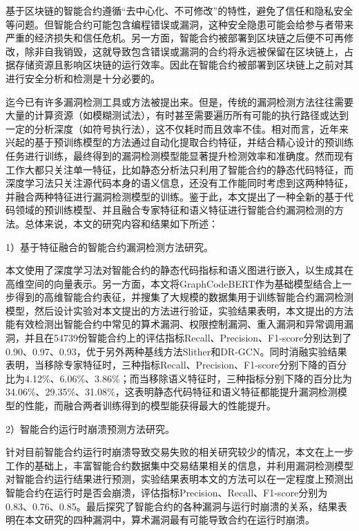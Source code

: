 \cleardoublepage
{}
基于区块链的智能合约遵循“去中心化、不可修改”的特性，避免了信任和隐私安全等问题。但智能合约可能包含编程错误或漏洞，这种安全隐患可能会给参与者带来严重的经济损失和信任危机。另一方面，智能合约被部署到区块链之后便不可再修改，除非自我销毁，这就导致包含错误或漏洞的合约将永远被保留在区块链上，占据存储资源且影响区块链的运行效率。因此在智能合约被部署到区块链上之前对其进行安全分析和检测是十分必要的。

迄今已有许多漏洞检测工具或方法被提出来。但是，传统的漏洞检测方法往往需要大量的计算资源（如模糊测试法），有时甚至需要遍历所有可能的执行路径或达到一定的分析深度（如符号执行法），这不仅耗时而且效率不佳。相对而言，近年来兴起的基于预训练模型的方法通过自动化提取合约特征，并结合精心设计的预训练任务进行训练，最终得到的漏洞检测模型能显著提升检测效率和准确度。然而现有工作大都只关注单一特征，比如静态分析法只利用了智能合约的静态代码特征，而深度学习法只关注源代码本身的语义信息，还没有工作能同时考虑到这两种特征，并融合两种特征进行漏洞检测模型的训练。鉴于此，本文提出了一种全新的基于代码领域的预训练模型、并且融合专家特征和语义特征进行智能合约漏洞检测的方法。总体来说，本文的研究内容和结果如下所述：

    1）基于特征融合的智能合约漏洞检测方法研究。
    
    本文使用了深度学习法对智能合约的静态代码指标和语义图进行嵌入，以生成其在高维空间的向量表示。另一方面，本文将GraphCodeBERT作为基础模型结合上一步得到的高维智能合约表征，并搜集了大规模的数据集用于训练智能合约漏洞检测模型，然后设计实验对本文提出的方法进行验证，实验结果表明，本文提出的方法能有效检测出智能合约中常见的算术漏洞、权限控制漏洞、重入漏洞和异常调用漏洞，并且在\num{54739}份智能合约上的评估指标Recall、Precision、F1-score分别达到了0.90、0.97、0.93，优于另外两种基线方法Slither和DR-GCN。同时消融实验结果表明，当移除专家特征时，三种指标Recall、Precision、F1-score分别下降的百分比为4.12\%、6.06\%、3.86\%；而当移除语义特征时，三种指标分别下降的百分比为34.06\%、29.35\%、31.08\%，这表明静态代码特征和语义特征都能提升漏洞检测模型的性能，而融合两者训练得到的模型能获得最大的性能提升。
    
    2）智能合约运行时崩溃预测方法研究。
    
    针对目前智能合约运行时崩溃导致交易失败的相关研究较少的情况，本文在上一步工作的基础上，丰富智能合约数据集中交易结果相关的信息，并利用漏洞检测模型对智能合约运行结果进行预测，实验结果表明本文的方法可以在一定程度上预测出智能合约在运行时是否会崩溃，评估指标Precision、Recall、F1-score分别为0.83、0.76、0.85。最后探究了智能合约的各种漏洞与运行时崩溃的关系，结果表明在本文研究的四种漏洞中，算术漏洞最有可能导致合约在运行时崩溃。



